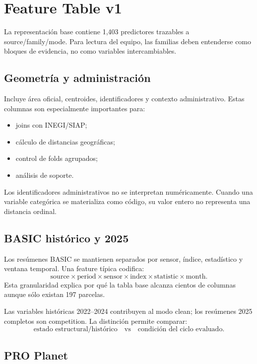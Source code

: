 \section{Feature Table v1}

La representación base contiene 1,403 predictores trazables a source/family/mode. Para lectura
del equipo, las familias deben entenderse como bloques de evidencia, no como variables
intercambiables.

\subsection{Geometría y administración}

Incluye área oficial, centroides, identificadores y contexto administrativo. Estas columnas son
especialmente importantes para:
\begin{itemize}
\item joins con INEGI/SIAP;
\item cálculo de distancias geográficas;
\item control de folds agrupados;
\item análisis de soporte.
\end{itemize}

Los identificadores administrativos no se interpretan numéricamente. Cuando una variable
categórica se materializa como código, su valor entero no representa una distancia ordinal.

\subsection{BASIC histórico y 2025}

Los resúmenes BASIC se mantienen separados por sensor, índice, estadístico y ventana temporal.
Una feature típica codifica:
\[
\text{source}\times\text{period}\times\text{sensor}
\times\text{index}\times\text{statistic}\times\text{month}.
\]
Esta granularidad explica por qué la tabla base alcanza cientos de columnas aunque sólo existan
197 parcelas.

Las variables históricas 2022--2024 contribuyen al modo clean; los resúmenes 2025 completos
son competition. La distinción permite comparar:
\[
\text{estado estructural/histórico}
\quad\text{vs}\quad
\text{condición del ciclo evaluado}.
\]

\subsection{PRO Planet}

